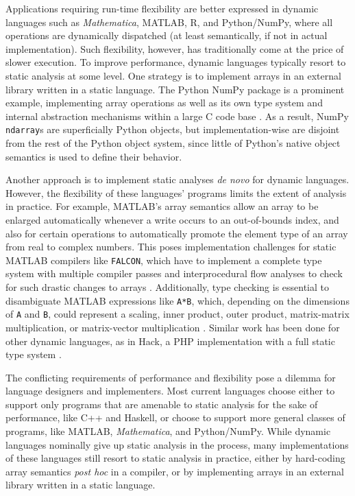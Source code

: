 \documentclass[preprint]{sigplanconf}
\newcommand{\MATLAB}{\textsc{MATLAB}}
\newcommand{\Mathematica}{\textit{Mathematica}}
\newcommand{\code}[1]{\texttt{#1}}
\begin{document}
Applications requiring run-time flexibility are better expressed in
dynamic languages such as \Mathematica, \MATLAB, R, and Python/NumPy, where
all operations are dynamically dispatched (at least semantically, if not
in actual implementation). Such flexibility,
however, has traditionally come at the price of slower execution.
To improve performance, dynamic languages typically resort to static analysis
at some level.
One strategy is to implement arrays in an external library
written in a static language.
The Python NumPy package is a prominent example, implementing array operations
as well as its own type system and internal abstraction mechanisms within
a large C code base \cite{Walt:2011np}. As a result, NumPy \code{ndarray}s are
superficially Python objects, but implementation-wise are disjoint from the
rest of the Python object system, since little of Python's native object
semantics is used to define their behavior.

Another approach is to implement static analyses
\textit{de novo} for dynamic languages. However, the flexibility
of these languages' programs limits the extent of analysis in practice. For example, \MATLAB's array
semantics allow an array to be enlarged automatically whenever a write occurs
to an out-of-bounds index, and also for certain operations to
automatically promote the element type of an array from real to complex
numbers. This poses implementation challenges for static \MATLAB{} compilers
like \code{FALCON}, which have to implement a complete type system with
multiple compiler passes and interprocedural flow analyses to check
for such drastic changes to arrays \cite{Rose:1999tt,
Li:2013mf}. Additionally, type checking is essential to disambiguate
\MATLAB{} expressions like \code{A*B}, which, depending on the dimensions of
\code{A} and \code{B}, could represent a scaling, inner product, outer
product, matrix-matrix multiplication, or matrix-vector multiplication
\cite{Rose:1999tt}. Similar work has been done for other dynamic languages,
as in Hack, a PHP implementation with a full static type system
\cite{Verlaguet:2014hn}.


The conflicting requirements of performance and flexibility pose a dilemma for
language designers and implementers. Most current languages choose either to
support only programs that are amenable to static analysis for the sake of
performance, like C++ and Haskell, or choose to support more general
classes of programs, like \MATLAB, \Mathematica, and Python/NumPy. While
dynamic languages nominally give up static analysis in the process, many
implementations of these languages still resort to static analysis in
practice, either by hard-coding array semantics \textit{post hoc} in a compiler, or by
implementing arrays in an external library written in a static language.
\end{document}
